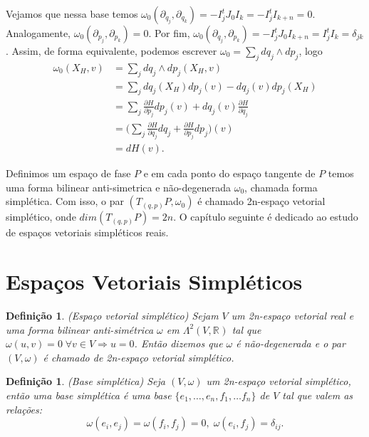 \documentclass[12pt]{book}
\newtheorem{definicao}[teorema]{Definição}
\newcommand{\campohamiltonianoabrev}{X_{H}}
\newcommand{\derivadaparcial}[2]{\frac{\partial #1}{\partial #2}}
\newcommand{\derivadaparcialabrev}[1]{\partial_{#1}}
\newcommand{\estruturacomplexa}{J_{0}}
\newcommand{\formaSimpleticaabrev}{\omega_{0}}
\newcommand{\formaSimpleticaPadrao}[2]{\omega_{0}(#1, #2)}
\newcommand{\real}[1]{\mathbb{R}^{#1}}
\begin{document}
	Vejamos que nessa base temos $\formaSimpleticaPadrao{\derivadaparcialabrev{q_{j}}}{\derivadaparcialabrev{q_{k}}} = -I_{j}^{t}\estruturacomplexa I_{k} = -I_{j}^{t}I_{k+n} = 0$. Analogamente, $\formaSimpleticaPadrao{\derivadaparcialabrev{p_{j}}}{\derivadaparcialabrev{p_{k}}} = 0$. Por fim, $\formaSimpleticaPadrao{\derivadaparcialabrev{q_{j}}}{\derivadaparcialabrev{p_{k}}} = -I_{j}^{t}\estruturacomplexa I_{k+n} = I_{j}^{t}I_{k} = \delta_{jk}$. Assim, de forma equivalente, podemos escrever $\formaSimpleticaabrev = \sum_{j}  dq_{j}\wedge dp_{j}$, logo
	$$
	\begin{aligned}
	\formaSimpleticaPadrao{\campohamiltonianoabrev}{v} 
	&= \sum_{j}  dq_{j}\wedge dp_{j}(\campohamiltonianoabrev, v) 
	\\
	&= \sum_{j}  dq_{j}(\campohamiltonianoabrev)dp_{j}(v) - dq_{j}(v)dp_{j}(\campohamiltonianoabrev)
	\\
	&= \sum_{j} \derivadaparcial{H}{p_{j}}dp_{j}(v) + dq_{j}(v)\derivadaparcial{H}{q_{j}}
	\\
	&= \Big(\sum_{j} \derivadaparcial{H}{q_{j}}dq_{j} +\derivadaparcial{H}{p_{j}}dp_{j} \Big)(v)
	\\
	&= dH(v).
	\end{aligned}
	$$
	
	Definimos um espaço de fase $P$ e em cada ponto do espaço tangente de $P$ temos uma forma bilinear anti-simetrica e não-degenerada $\formaSimpleticaabrev$, chamada forma simplética. Com isso, o par $(T_{(q,p)}P, \formaSimpleticaabrev)$ é chamado 2n-espaço vetorial simplético, onde $dim(T_{(q,p)}P) = 2n$. O capítulo seguinte é dedicado ao estudo de espaços vetoriais simpléticos reais.
	
	\section{Espaços Vetoriais Simpléticos}
	\begin{definicao}
		(Espaço vetorial simplético) Sejam $V$ um 2n-espaço vetorial real e uma forma bilinear anti-simétrica $\omega$ em $\Lambda^{2}(V, \real{})$ tal que $\omega(u,v) = 0 \; \forall v \in V \Rightarrow u=0$. Então dizemos que $\omega$ é não-degenerada e o par $(V, \omega)$ é chamado de 2n-espaço vetorial simplético.
	\end{definicao}
	
	\begin{definicao}
		(Base simplética) Seja $(V, \omega)$ um 2n-espaço vetorial simplético, então uma base simplética é uma base $\{ e_{1},\dots, e_{n},f_{1},\dots f_{n}\}$ de $V$ tal que valem as relações:
		$$
		\omega(e_{i}, e_{j}) = \omega(f_{i}, f_{j}) = 0, \; \omega(e_{i}, f_{j}) = \delta_{ij}.
		$$
	\end{definicao}
	
\end{document}
